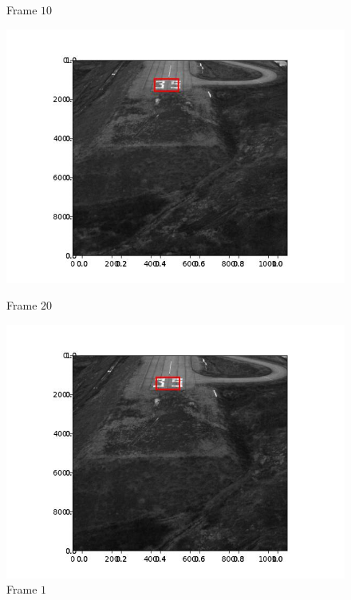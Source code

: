 \begin{figure}[H]
\begin{minipage}{.49\textwidth}
    \caption{Frame $10$}
  \end{minipage}
  \hfill
  \begin{minipage}{.49\textwidth}
    \centering
    \includegraphics[width=\textwidth]{./figures/lk/landing/frame000020.jpg}
    \caption{Frame $20$}
  \end{minipage}
  \begin{minipage}{.49\textwidth}
    \centering
    \includegraphics[width=\textwidth]{./figures/lk/landing/frame000030.jpg}
    \caption{Frame $1$}
  \end{minipage}
  \hfill
  \begin{minipage}{.49\textwidth}
    \centering

\end{minipage}
\end{figure}
